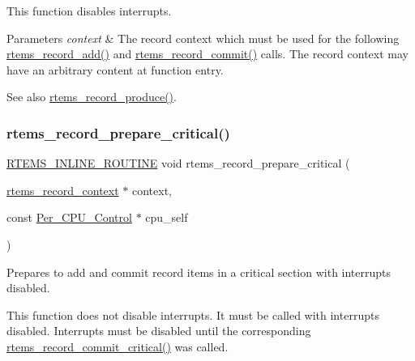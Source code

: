 This function disables interrupts.


\begin{DoxyParams}{Parameters}
{\em context} & The record context which must be used for the following \mbox{\hyperlink{group__RTEMSRecord_ga5e164fc0a361be6cac976c3afa8ec732}{rtems\+\_\+record\+\_\+add()}} and \mbox{\hyperlink{group__RTEMSRecord_gac80cf4761566e19371353c9c72271e84}{rtems\+\_\+record\+\_\+commit()}} calls. The record context may have an arbitrary content at function entry.\\
\hline
\end{DoxyParams}
\begin{DoxySeeAlso}{See also}
\mbox{\hyperlink{group__RTEMSRecord_ga136d81367324d6729819192181ea68bb}{rtems\+\_\+record\+\_\+produce()}}. 
\end{DoxySeeAlso}
\mbox{\label{group__RTEMSRecord_ga0a5b38b980ea05d87c3aa22844357575}} 
\subsubsection{\texorpdfstring{rtems\_record\_prepare\_critical()}{rtems\_record\_prepare\_critical()}}
{\footnotesize\ttfamily \mbox{\hyperlink{group__RTEMSScoreBaseDefs_gac216239df231d5dbd15e3520b0b9313f}{R\+T\+E\+M\+S\+\_\+\+I\+N\+L\+I\+N\+E\+\_\+\+R\+O\+U\+T\+I\+NE}} void rtems\+\_\+record\+\_\+prepare\+\_\+critical (\begin{DoxyParamCaption}\item[{\mbox{\hyperlink{structrtems__record__context}{rtems\+\_\+record\+\_\+context}} $\ast$}]{context,  }\item[{const \mbox{\hyperlink{structPer__CPU__Control}{Per\+\_\+\+C\+P\+U\+\_\+\+Control}} $\ast$}]{cpu\+\_\+self }\end{DoxyParamCaption})}



Prepares to add and commit record items in a critical section with interrupts disabled. 

This function does not disable interrupts. It must be called with interrupts disabled. Interrupts must be disabled until the corresponding \mbox{\hyperlink{group__RTEMSRecord_ga2a34e1207be9164960fd9fe9bf18bb57}{rtems\+\_\+record\+\_\+commit\+\_\+critical()}} was called.


